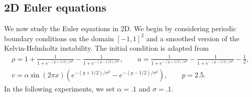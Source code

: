 \documentclass[preprint,10pt]{elsarticle}
\theoremstyle{definition}
\theoremstyle{lemma}
\theoremstyle{theorem}
\theoremstyle{assumption}
\newcommand{\LRp}[1]{\left( #1 \right)}
\newcommand{\note}[1]{{\color{blue}{#1}}}
\begin{document}





\subsection{2D Euler equations}

We now study the Euler equations in 2D.  We begin by considering periodic boundary conditions on the domain $[-1,1]^2$ and a smoothed version of the Kelvin-Helmholtz instability.  The initial condition is adapted from \cite{munz1989numerical, maboudi2018conservative}
\begin{gather*}
\rho = 1 + \frac{1}{1+e^{-(y+1/2)/\sigma^2}} - \frac{1}{1+e^{-(y-1/2)/\sigma^2}}, \qquad
u =  \frac{1}{1+e^{-(y+1/2)/\sigma^2}} - \frac{1}{1+e^{-(y-1/2)/\sigma^2}} - \frac{1}{2}, \\
v = \alpha\sin(2\pi x) \LRp{e^{-(y+1/2)/\sigma^2} - e^{-(y-1/2)/\sigma^2}},\qquad
p = 2.5.
\end{gather*}
In the following experiments, we set $\alpha = .1$ and $\sigma = .1$.  
\end{document}
